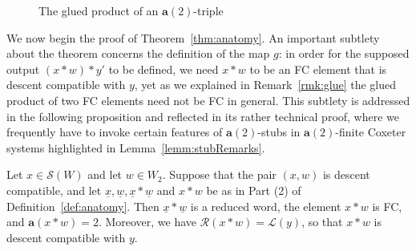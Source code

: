 \documentclass[ALCO,Unicode,published]{cedram}
\newcommand{\call}{\mathcal{L}}
\newcommand{\calr}{\mathcal{R}}
\newcommand{\la}{\mathbf{a}}
\newcommand{\sw}{\mathcal{S}(W)}
\newcommand{\ul}{\underline}
\begin{document}
\begin{example}
\begin{figure}
\begin{center}
    \end{center}
    \caption{The glued product of an $\la(2)$-triple}
    \label{fig:anatomy}
\end{figure}
\end{example}

We now begin the proof of Theorem~\ref{thm:anatomy}. An important subtlety about the theorem concerns the
definition of the map $g$: in order for the supposed output $(x*w)*y'$ to be defined, we need $x*w$
to be an FC element that is descent compatible with $y$, yet as we explained in Remark~\ref{rmk:glue} the
glued product of two FC elements need not be FC in general.  This subtlety is addressed in the
following proposition and reflected in its rather technical proof, where we frequently have to
invoke certain features of $\la(2)$-stubs in $\la(2)$-finite Coxeter systems highlighted in
Lemma~\ref{lemm:stubRemarks}.

\begin{prop}
    \label{prop:plugin}
    Let $x\in \sw$ and let $w\in W_2$. Suppose that the pair $(x,w)$ is descent compatible, and let
    $\ul x, \ul w, \ul x*\ul w$ and $x*w$ be as in Part \textup{(2)} of Definition~\ref{def:anatomy}. Then
    $\ul x*\ul w$ is a reduced word, the element $x*w$ is FC, and $\la(x*w)=2$. Moreover, we have
    $\calr(x*w)=\call(y)$, so that $x*w$ is descent compatible with $y$. 
\end{prop}
\end{document}
